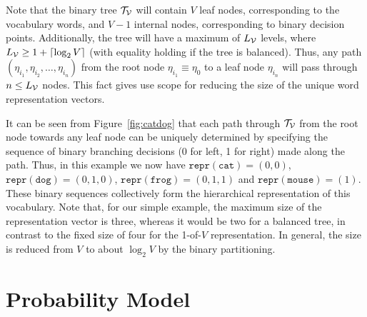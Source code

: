 \documentclass[a4paper]{article}
\begin{document}
Note that the binary tree ${\cal T}_{\cal V}$ will contain $V$ leaf nodes, corresponding to the vocabulary words, and
$V-1$ internal nodes, corresponding to binary decision points. 
Additionally, the tree will have a maximum of $L_{\cal V}$ levels, where
$L_{\cal V}\ge 1+\lceil\log_2 V\rceil$ (with equality holding if the tree is balanced).
Thus, any path $(\eta_{i_1},\eta_{i_2},\ldots,\eta_{i_n})$ 
from the root node $\eta_{i_1}\equiv\eta_{0}$ to a leaf node $\eta_{i_n}$ will pass through $n \le L_{\cal V}$ nodes.
This fact gives use scope for reducing the size of the unique word representation vectors.

It can be seen from Figure~\ref{fig:catdog} that each path through ${\cal T}_{\cal V}$ 
from the root node towards any leaf node
can be uniquely determined by specifying the 
sequence of binary branching decisions (0 for left, 1 for right) made along the path.
Thus, in this example we now have $\texttt{repr}(\texttt{cat})=(0,0)$, 
$\texttt{repr}(\texttt{dog})=(0,1,0)$, $\texttt{repr}(\texttt{frog})=(0,1,1)$
and $\texttt{repr}(\texttt{mouse})=(1)$.
These binary sequences collectively form the hierarchical representation of this vocabulary.
Note that, for our simple example, the maximum size of the representation vector is three, whereas it would be two for a balanced tree,
in contrast to the fixed size of four for the 1-of-$V$ representation.
In general, the size is reduced from $V$ to about $\log_2 V$ by the binary partitioning.

\section{Probability Model}
\end{document}
